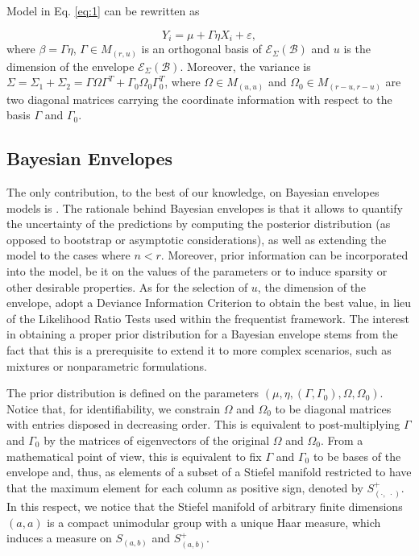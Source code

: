 \documentclass[graybox]{svmult}
\begin{document}
Model in Eq. \ref{eq:1} can be rewritten as

\begin{equation}
  \label{eq:3}
  Y_i = \mu + \Gamma \eta X_i + \varepsilon,
\end{equation}
where $\beta = \Gamma \eta$, $\Gamma \in M_{\left( r, u \right)}$ is
an orthogonal basis of
$\mathcal{E}_{\Sigma}\left( \mathcal{B} \right)$ and $u$ is the
dimension of the envelope
$\mathcal{E}_{\Sigma}\left( \mathcal{B} \right)$. Moreover, the
variance is
$\Sigma = \Sigma_1 + \Sigma_2 = \Gamma \Omega \Gamma^T + \Gamma_0
\Omega_0 \Gamma_0^T$, where $\Omega \in M_{\left( u, u \right)}$ and $\Omega_0 \in M_{\left( r-u, r-u \right)}$ are two diagonal matrices carrying the coordinate information with respect to the basis $\Gamma$ and $\Gamma_0$.

\subsection{Bayesian Envelopes}
The only contribution, to the best of our knowledge, on Bayesian
envelopes models is \cite{khareBayesianApproachEnvelope2017}. The
rationale behind Bayesian envelopes is that it allows to quantify the
uncertainty of the predictions by computing the posterior distribution
(as opposed to bootstrap or asymptotic considerations), as well as
extending the model to the cases where $n < r$. Moreover, prior
information can be incorporated into the model, be it on the values of
the parameters or to induce sparsity or other desirable properties. As
for the selection of $u$, the dimension of the envelope,
\cite{khareBayesianApproachEnvelope2017} adopt a Deviance Information
Criterion to obtain the best value, in lieu of the Likelihood Ratio
Tests used within the frequentist framework.  The interest in
obtaining a proper prior distribution for a Bayesian envelope stems
from the fact that this is a prerequisite to extend it to more complex
scenarios, such as mixtures or nonparametric formulations.

The prior distribution is defined on the parameters
$\left( \mu, \eta, \left(\Gamma, \Gamma_0\right), \Omega, \Omega_0
\right)$. Notice that, for identifiability, we constrain $\Omega$ and
$\Omega_0$ to be diagonal matrices with entries disposed in decreasing
order. This is equivalent to post-multiplying $\Gamma$ and $\Gamma_0$
by the matrices of eigenvectors of the original $\Omega$ and
$\Omega_0$. From a mathematical point of view, this is equivalent to
fix $\Gamma$ and $\Gamma_0$ to be bases of the envelope and, thus, as
elements of a subset of a Stiefel manifold restricted to have that the
maximum element for each column as positive sign, denoted by
$S^+_{\left( \cdot,\; \cdot \right)}$. In this respect, we notice that
the Stiefel manifold of arbitrary finite dimensions
$\left( a, a \right)$ is a compact unimodular group with a unique Haar
measure, which induces a measure on $S_{\left( a, b\right)}$ and
$S^+_{\left( a, b \right)}$.
\end{document}

